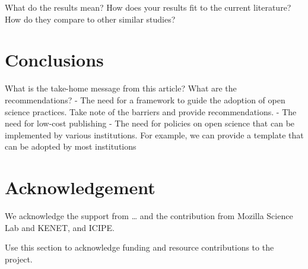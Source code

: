 What do the results mean? How does your results fit to the current
literature? How do they compare to other similar studies?

\section*{Conclusions}\label{conclusions}

What is the take-home message from this article? What are the
recommendations? - The need for a framework to guide the adoption of
open science practices. Take note of the barriers and provide
recommendations. - The need for low-cost publishing - The need for
policies on open science that can be implemented by various
institutions. For example, we can provide a template that can be adopted
by most institutions

\section{Acknowledgement}\label{acknowledgement}

We acknowledge the support from \ldots{} and the contribution from
Mozilla Science Lab and KENET, and ICIPE.

Use this section to acknowledge funding and resource contributions to
the project.
